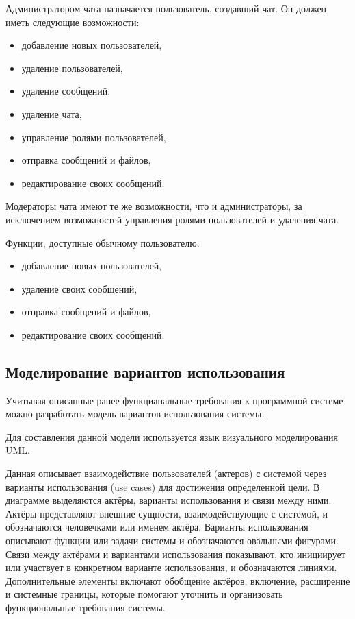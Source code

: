 Администратором чата назначается пользователь, создавший чат. Он должен иметь следующие возможности:
\begin{itemize}
	\item добавление новых пользователей,
	\item удаление пользователей,
	\item удаление сообщений,
	\item удаление чата,
	\item управление ролями пользователей,
	\item отправка сообщений и файлов,
	\item редактирование своих сообщений.
\end{itemize}

Модераторы чата имеют те же возможности, что и администраторы, за исключением возможностей управления ролями пользователей и удаления чата.

Функции, доступные обычному пользователю:
\begin{itemize}
	\item добавление новых пользователей,
	\item удаление своих сообщений,
	\item отправка сообщений и файлов,
	\item редактирование своих сообщений.
\end{itemize}

\subsection{Моделирование вариантов использования}

Учитывая описанные ранее функцианальные требования к программной системе можно разработать модель вариантов использования системы.

Для составления данной модели используется язык визуального моделирования UML.

Данная описывает взаимодействие пользователей (актеров) с системой через варианты использования (use cases) для достижения определенной цели. В диаграмме выделяются актёры, варианты использования и связи между ними. Актёры представляют внешние сущности, взаимодействующие с системой, и обозначаются человечками или именем актёра. Варианты использования описывают функции или задачи системы и обозначаются овальными фигурами. Связи между актёрами и вариантами использования показывают, кто инициирует или участвует в конкретном варианте использования, и обозначаются линиями. Дополнительные элементы включают обобщение актёров, включение, расширение и системные границы, которые помогают уточнить и организовать функциональные требования системы. 

